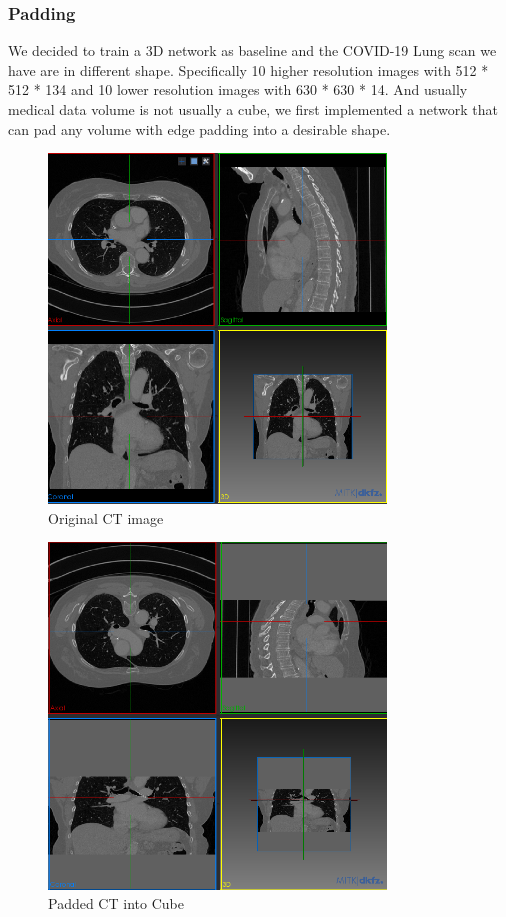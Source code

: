 \subsubsection*{Padding}
We decided to train a 3D network as baseline and the COVID-19 Lung scan we have are in different shape. Specifically 10 higher resolution images with 512 * 512 * 134 and 10 lower resolution images with 630 * 630 * 14. And usually medical data volume is not usually a cube, we first implemented a network that can pad any volume with edge padding into a desirable shape.

\begin{figure}
\centering
\includegraphics[width = 0.8\textwidth]{img/Original_ct.png}
\caption{Original CT image}
\label{fig:original}
\end{figure}

\begin{figure}
\centering
\includegraphics[width = 0.8\textwidth]{img/Padded_CT.png}
\caption{Padded CT into Cube}
\label{fig:padded}
\end{figure}


